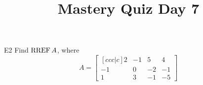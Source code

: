 \documentclass{sbgLAquiz}
\title{Mastery Quiz Day 7 }
\begin{document}
\begin{problem}{E2}
Find \(\operatorname{RREF} A\), where
\[
  A =
  \begin{bmatrix}[ccc|c]
    2 & -1 & 5 & 4 \\
    -1 & 0 & -2 & -1 \\
    1 & 3 & -1 & -5
  \end{bmatrix}
\]
\end{problem}
\end{document}
